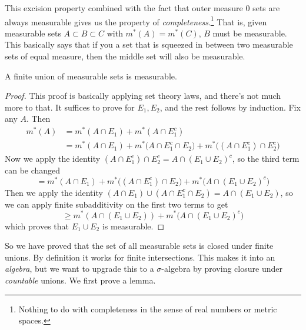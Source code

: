   This excision property combined with the fact that outer measure 0 sets are always measurable gives us the property of \textit{completeness}.\footnote{Nothing to do with completeness in the sense of real numbers or metric spaces.} That is, given measurable sets $A \subset B \subset C$ with $m^\ast(A) = m^\ast (C)$, $B$ must be measurable. This basically says that if you a set that is squeezed in between two measurable sets of equal measure, then the middle set will also be measurable. 

  \begin{lemma}
    A finite union of measurable sets is measurable. 
  \end{lemma}
  \begin{proof}
    This proof is basically applying set theory laws, and there's not much more to that. It suffices to prove for $E_1, E_2$, and the rest follows by induction. Fix any $A$. Then 
    \begin{align}
      m^\ast (A) & = m^\ast (A \cap E_1) + m^\ast (A \cap E_1^c) \\ 
                   & = m^\ast (A \cap E_1) + m^\ast \big(A \cap E_1^c \cap E_2 \big) + m^\ast \big((A \cap E_1^c) \cap E_2^c \big)
    \end{align}
    Now we apply the identity $(A \cap E_1^c) \cap E_2^c = A \cap (E_1 \cup E_2)^c$, so the third term can be changed 
    \begin{equation}
      = m^\ast (A \cap E_1) + m^\ast \big((A \cap E_1^c) \cap E_2 \big) + m^\ast \big( A \cap (E_1 \cup E_2)^c \big)
    \end{equation}
    Then we apply the identity $(A \cap E_1) \cup (A \cap E_1^c \cap E_2) = A \cap (E_1 \cup E_2)$, so we can apply finite subadditivity on the first two terms to get 
    \begin{equation}
      \geq m^\ast (A \cap (E_1 \cup E_2)) + m^\ast \big( A \cap (E_1 \cup E_2)^c \big)
    \end{equation}
    which proves that $E_1 \cup E_2$ is measurable. 
  \end{proof} 

  So we have proved that the set of all measurable sets is closed under finite unions. By definition it works for finite intersections. This makes it into an \textit{algebra}, but we want to upgrade this to a $\sigma$-algebra by proving closure under \textit{countable} unions. We first prove a lemma. 

